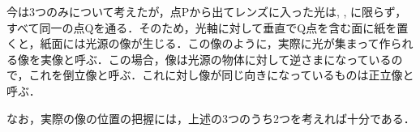 \hspace{1zw}今は3つのみについて考えたが，点$\mathrm{P}$から出てレンズに入った光は, , に限らず，{\gtfamily すべて同一の点$\mathrm{Q}$を通る．}そのため，光軸に対して垂直で$\mathrm{Q}$点を含む面に紙を置くと，紙面には光源の像が生じる．この像のように，実際に光が集まって作られる像を{\gtfamily 実像}と呼ぶ．この場合，像は光源の物体に対して逆さまになっているので，これを{\gtfamily 倒立像}と呼ぶ．これに対し像が同じ向きになっているものは{\gtfamily 正立像}と呼ぶ．

\hspace{1zw}なお，実際の像の位置の把握には，上述の3つのうち2つを考えれば十分である．

\bsNeed{62mm}
